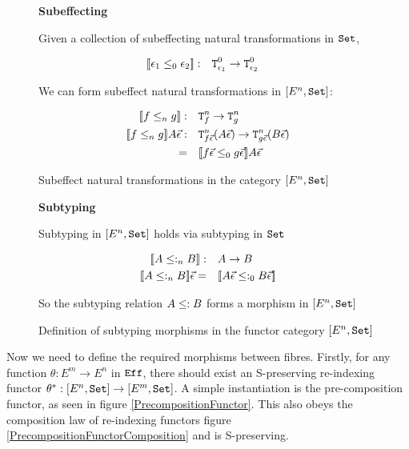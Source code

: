 \documentclass{Report}
\begin{document}
\begin{figure}
    \begin{framed}
        
        \centering\textbf{Subeffecting}


        Given a collection of subeffecting natural transformations in $\texttt{Set}$,
        
        \begin{align*}
            {\bf [\![}\epsilon_1\leq_0 \epsilon_2{\bf ]\!]}:&\quad \texttt{T}^0_{\epsilon_1} \rightarrow \texttt{T}^0_{\epsilon_2}
        \end{align*}
        
        We can form subeffect natural transformations in $[E^n, \texttt{Set}]$:
        
        \begin{align*}
            {\bf [\![}f\leq_n g{\bf ]\!]}:&\quad\texttt{T}^n_{f}\rightarrow \texttt{T}^n_{g}\\
            {\bf [\![}f\leq_n g{\bf ]\!]} A \vec{\epsilon}:&\quad\texttt{T}^n_{f\vec{\epsilon}}(A\vec{\epsilon})\rightarrow \texttt{T}^n_{g\vec{\epsilon}}(B\vec{\epsilon})\\
            =&\quad {\bf [\![}f\vec{\epsilon}\leq_0 g\vec{\epsilon}{\bf ]\!]}A\vec{\epsilon}
        \end{align*}
    \end{framed}
    \caption{Subeffect natural transformations in the category $[E^n, \texttt{Set}]$}
    \label{HowToBuildSubeffecting}
\end{figure}

\begin{figure}
    \begin{framed}
        
\centering\textbf{Subtyping}


Subtyping in $[E^n, \texttt{Set}]$ holds via subtyping in $\texttt{Set}$

\begin{align*}
    {\bf [\![}A\leq:_n B{\bf ]\!]}:&\quad A\rightarrow B\\
    {\bf [\![}A\leq:_n B{\bf ]\!]}\vec{\epsilon}=&\quad {\bf [\![}A\vec{\epsilon}\leq:_0 B\vec{\epsilon}{\bf ]\!]}
\end{align*}

So the subtyping relation $A \leq: B$ forms a morphism in $[E^n, \texttt{Set}]$

    \end{framed}
    \caption{Definition of subtyping morphisms in the functor category $[E^n, \texttt{Set}]$}
    \label{HowToBuildSubtyping}
\end{figure}

Now we need to define the required morphisms between fibres. Firstly, for any function $\theta: E^m \rightarrow E^n$ in $\texttt{Eff}$, there should exist an S-preserving re-indexing functor $\theta^*: [E^n, \texttt{Set}] \rightarrow [E^m, \texttt{Set}]$. A simple instantiation is the pre-composition functor, as seen in figure \ref{PrecompositionFunctor}. This also obeys the composition law of re-indexing functors figure \ref{PrecompositionFunctorComposition} and is S-preserving.
\end{document}
